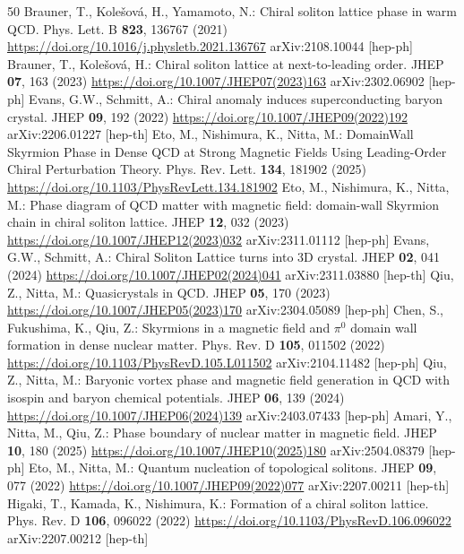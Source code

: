 \begin{thebibliography}{50}
 Brauner, T., Kole\v{s}ov\'a, H., Yamamoto, N.: Chiral soliton lattice phase in warm QCD. Phys. Lett. B \textbf{823}, 136767 (2021) \url{https://doi.org/10.1016/j.physletb.2021.136767} arXiv:2108.10044 [hep-ph]
 Brauner, T., Kole\v{s}ov\'a, H.: Chiral soliton lattice at next-to-leading order. JHEP \textbf{07}, 163 (2023) \url{https://doi.org/10.1007/JHEP07(2023)163} arXiv:2302.06902 [hep-ph]
 Evans, G.W., Schmitt, A.: Chiral anomaly induces superconducting baryon crystal. JHEP \textbf{09}, 192 (2022) \url{https://doi.org/10.1007/JHEP09(2022)192} arXiv:2206.01227 [hep-th]
 Eto, M., Nishimura, K., Nitta, M.: DomainWall Skyrmion Phase in Dense QCD at Strong Magnetic Fields Using Leading-Order Chiral Perturbation Theory. Phys. Rev. Lett. \textbf{134}, 181902 (2025) \url{https://doi.org/10.1103/PhysRevLett.134.181902}
 Eto, M., Nishimura, K., Nitta, M.: Phase diagram of QCD matter with magnetic field: domain-wall Skyrmion chain in chiral soliton lattice. JHEP \textbf{12}, 032 (2023) \url{https://doi.org/10.1007/JHEP12(2023)032} arXiv:2311.01112 [hep-ph]
 Evans, G.W., Schmitt, A.: Chiral Soliton Lattice turns into 3D crystal. JHEP \textbf{02}, 041 (2024) \url{https://doi.org/10.1007/JHEP02(2024)041} arXiv:2311.03880 [hep-th]
 Qiu, Z., Nitta, M.: Quasicrystals in QCD. JHEP \textbf{05}, 170 (2023) \url{https://doi.org/10.1007/JHEP05(2023)170} arXiv:2304.05089 [hep-ph]
 Chen, S., Fukushima, K., Qiu, Z.: Skyrmions in a magnetic field and $\pi^0$ domain wall formation in dense nuclear matter. Phys. Rev. D \textbf{105}, 011502 (2022) \url{https://doi.org/10.1103/PhysRevD.105.L011502} arXiv:2104.11482 [hep-ph]
 Qiu, Z., Nitta, M.: Baryonic vortex phase and magnetic field generation in QCD with isospin and baryon chemical potentials. JHEP \textbf{06}, 139 (2024) \url{https://doi.org/10.1007/JHEP06(2024)139} arXiv:2403.07433 [hep-ph]
 Amari, Y., Nitta, M., Qiu, Z.: Phase boundary of nuclear matter in magnetic field. JHEP \textbf{10}, 180 (2025) \url{https://doi.org/10.1007/JHEP10(2025)180} arXiv:2504.08379 [hep-ph]
 Eto, M., Nitta, M.: Quantum nucleation of topological solitons. JHEP \textbf{09}, 077 (2022) \url{https://doi.org/10.1007/JHEP09(2022)077} arXiv:2207.00211 [hep-th]
 Higaki, T., Kamada, K., Nishimura, K.: Formation of a chiral soliton lattice. Phys. Rev. D \textbf{106}, 096022 (2022) \url{https://doi.org/10.1103/PhysRevD.106.096022} arXiv:2207.00212 [hep-th]

\end{thebibliography}
